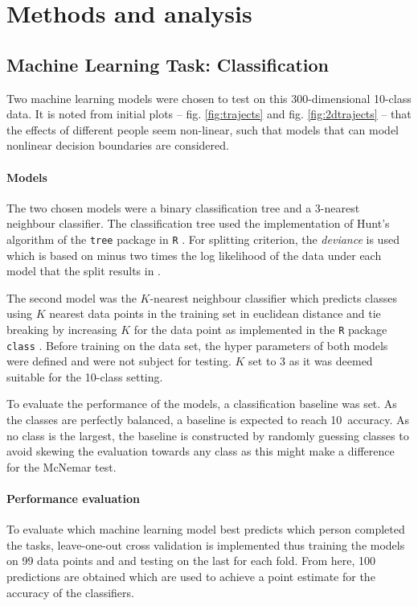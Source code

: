 \documentclass[12pt,fleqn]{article}
\begin{document}
\section{Methods and analysis}


\subsection{Machine Learning Task: Classification}
Two machine learning models were chosen to test on this 300-dimensional 10-class data.
It is noted from initial plots -- fig. \ref{fig:trajects} and fig. \ref{fig:2dtrajects} -- that the effects of different people seem non-linear, such that models that can model nonlinear decision boundaries are considered.
\paragraph{Models} The two chosen models were a binary classification tree and a 3-nearest neighbour classifier. The classification tree used the implementation of Hunt's algorithm of the \texttt{tree} package in \texttt{R} \cite{Tree}. For splitting criterion, the \textit{deviance} is used which is based on minus two times the log likelihood of the data under each model that the split results in \cite{Deviance}.

The second model was the \(K\)-nearest neighbour classifier which predicts classes using \(K\) nearest data points in the training set in euclidean distance and tie breaking by increasing \(K\) for the data point as implemented in the \texttt{R} package \texttt{class} \cite{KNN}. Before training on the data set, the hyper parameters of both models were defined and were not subject for testing. \(K\) set to 3 as it was deemed suitable for the 10-class setting.

To evaluate the performance of the models, a classification baseline was set. As the classes are perfectly balanced, a baseline is expected to reach 10\pro\ accuracy. As no class is the largest, the baseline is constructed by randomly guessing classes to avoid skewing the evaluation towards any class as this might make a difference for the McNemar test.
\paragraph{Performance evaluation}
To evaluate which machine learning model best predicts which person completed the tasks, leave-one-out cross validation is implemented thus training the models on 99 data points and and testing on the last for each fold.
From here, 100 predictions are obtained which are used to achieve a point estimate for the accuracy of the classifiers.
\end{document}
